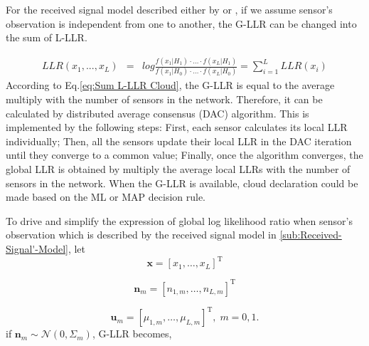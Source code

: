 For the received signal model described either by 
or , if we assume sensor\textquoteright{}s
observation is independent from one to another, the G-LLR can be changed
into the sum of L-LLR. 

\begin{eqnarray}
LLR(x_{1},...,x_{L}) & = & log\frac{f\left(x_{1}|H_{1}\right)\cdot\ldots\cdot f\left(x_{L}|H_{1}\right)}{f\left(x_{1}|H_{0}\right)\cdot\ldots\cdot f\left(x_{L}|H_{0}\right)}=\sum_{i=1}^{L}LLR\left(x_{i}\right)\label{eq:Sum L-LLR Cloud}
\end{eqnarray}
According to Eq.\ref{eq:Sum L-LLR Cloud}, the G-LLR is equal to the
average multiply with the number of sensors in the network. Therefore,
it can be calculated by distributed average consensus (DAC) algorithm.
This is implemented by the following steps: First, each sensor calculates
its local LLR individually; Then, all the sensors update their local
LLR in the DAC iteration until they converge to a common value; Finally,
once the algorithm converges, the global LLR is obtained by multiply
the average local LLRs with the number of sensors in the network.
When the G-LLR is available, cloud declaration could be made based
on the ML or MAP decision rule.

To drive and simplify the expression of global log likelihood ratio
when sensor\textquoteright{}s observation which is described by the
received signal model in \ref{sub:Received-Signal'-Model}, let 
\[
\mathbf{x}=\left[x_{1},\ldots,x_{L}\right]^{\mathrm{T}}
\]


\[
\mathbf{n}_{m}=\left[n_{1,m},\ldots,n_{L,m}\right]^{\mathrm{T}}
\]


\begin{equation}
\mathbf{u}_{m}=\left[\mu_{1,m},\ldots,\mu_{L,m}\right]^{\mathrm{T}},\; m=0,1.
\end{equation}
 if $\mathbf{n}_{m}\sim\mathcal{N}\left(0,\Sigma_{m}\right)$, G-LLR
becomes, 

